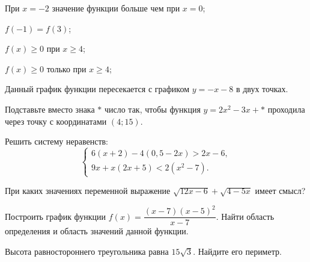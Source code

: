 \begin{class}[number=2]
\begin{listofex}
\begin{enumcols}[itemcolumns=1]
			\item При \( x=-2 \) значение функции больше чем при \( x=0 \);
			\item \( f(-1)=f(3) \);
			\item \( f(x)\ge0 \) при \( x\ge4 \);
			\item \( f(x)\ge0 \) только при \( x\ge4 \);
			\item Данный график функции пересекается с графиком \( y=-x-8 \) в двух точках.
		\end{enumcols}
		\item Подставьте вместо знака \( * \) число так, чтобы функция \( y=2x^2-3x+* \) проходила через точку с координатами \( (4;15) \).
		\item Решить систему неравенств:
		\[ \left\{
		\begin{array}{l}
			6(x+2)-4(0,5-2x)>2x-6,\\
			9x+x(2x+5)<2(x^2-7).
		\end{array}
		\right. \]
		\item При каких значениях переменной выражение \( \sqrt{12x-6}+\sqrt{4-5x} \) имеет смысл?
		\item Построить график функции \( f(x)=\dfrac{(x-7)(x-5)^2}{x-7} \). Найти область определения и область значений данной функции.
		\item Высота равностороннего треугольника равна \( 15\sqrt{3} \). Найдите его периметр.
	\end{listofex}
\end{class}
%
%
%
%
%
